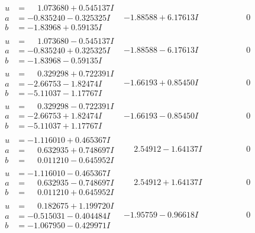 \documentclass[1p]{elsarticle_modified}
\theoremstyle{definition}
\begin{document}
$$\begin{array}{c|c|c}
\begin{aligned}
u &= \phantom{-}1.073680 + 0.545137 I \\
a &= -0.835240 - 0.325325 I \\
b &= -1.83968 + 0.59135 I\end{aligned}
 & -1.88588 + 6.17613 I & \phantom{-0.000000 } 0 \\ \hline\begin{aligned}
u &= \phantom{-}1.073680 - 0.545137 I \\
a &= -0.835240 + 0.325325 I \\
b &= -1.83968 - 0.59135 I\end{aligned}
 & -1.88588 - 6.17613 I & \phantom{-0.000000 } 0 \\ \hline\begin{aligned}
u &= \phantom{-}0.329298 + 0.722391 I \\
a &= -2.66753 - 1.82474 I \\
b &= -5.11037 - 1.17767 I\end{aligned}
 & -1.66193 + 0.85450 I & \phantom{-0.000000 } 0 \\ \hline\begin{aligned}
u &= \phantom{-}0.329298 - 0.722391 I \\
a &= -2.66753 + 1.82474 I \\
b &= -5.11037 + 1.17767 I\end{aligned}
 & -1.66193 - 0.85450 I & \phantom{-0.000000 } 0 \\ \hline\begin{aligned}
u &= -1.116010 + 0.465367 I \\
a &= \phantom{-}0.632935 + 0.748697 I \\
b &= \phantom{-}0.011210 - 0.645952 I\end{aligned}
 & \phantom{-}2.54912 - 1.64137 I & \phantom{-0.000000 } 0 \\ \hline\begin{aligned}
u &= -1.116010 - 0.465367 I \\
a &= \phantom{-}0.632935 - 0.748697 I \\
b &= \phantom{-}0.011210 + 0.645952 I\end{aligned}
 & \phantom{-}2.54912 + 1.64137 I & \phantom{-0.000000 } 0 \\ \hline\begin{aligned}
u &= \phantom{-}0.182675 + 1.199720 I \\
a &= -0.515031 - 0.404484 I \\
b &= -1.067950 - 0.429971 I\end{aligned}
 & -1.95759 - 0.96618 I & \phantom{-0.000000 } 0 \\ \hline\begin{aligned}

\end{aligned}
\end{array}$$
\end{document}
